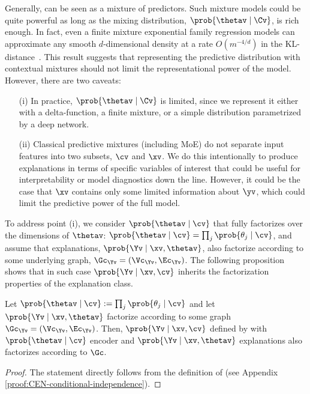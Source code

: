 \documentclass[twoside,11pt]{article}
\begin{document}
\noindent
Generally, {\CEN} can be seen as a mixture of predictors.
Such mixture models could be quite powerful as long as the mixing distribution, $\prob{\thetav \mid \Cv}$, is rich enough.
In fact, even a finite mixture exponential family regression models can approximate any smooth $d$-dimensional density at a rate $O(m^{-4/d})$ in the KL-distance~\citep{jiang1999hierarchical}.
This result suggests that representing the predictive distribution with contextual mixtures should not limit the representational power of the model.
However, there are two caveats:
\begin{itemize}[itemsep=0pt,parsep=1ex,topsep=1ex]
    \item[(i)] In practice, $\prob{\thetav \mid \Cv}$ is limited, since we represent it either with a delta-function, a finite mixture, or a simple distribution parametrized by a deep network.

    \item[(ii)] Classical predictive mixtures (including MoE) do not separate input features into two subsets, $\cv$ and $\xv$.
    We do this intentionally to produce explanations in terms of specific variables of interest that could be useful for interpretability or model diagnostics down the line.
    However, it could be the case that $\xv$ contains only some limited information about $\yv$, which could limit the predictive power of the full model.
\end{itemize}
To address point (i), we consider $\prob{\thetav \mid \cv}$ that fully factorizes over the dimensions of $\thetav$: $\prob{\thetav \mid \cv} = \prod_{j}\prob{\theta_j \mid \cv}$, and assume that explanations, $\prob{\Yv \mid \xv, \thetav}$, also factorize according to some underlying graph, $\Gc_{\Yv} = (\Vc_{\Yv}, \Ec_{\Yv})$.
The following proposition shows that in such case $\prob{\Yv \mid \xv, \cv}$ inherits the factorization properties of the explanation class.
\begin{proposition}
    \label{prop:CEN-conditional-independence}
    Let $\prob{\thetav \mid \cv} := \prod_{j}\prob{\theta_j \mid \cv}$ and let $\prob{\Yv \mid \xv, \thetav}$ factorize according to some graph $\Gc_{\Yv} = (\Vc_{\Yv}, \Ec_{\Yv})$.
    Then, $\prob{\Yv \mid \xv, \cv}$ defined by {\CEN} with $\prob{\thetav \mid \cv}$ encoder and $\prob{\Yv \mid \xv, \thetav}$ explanations also factorizes according to $\Gc$.
\end{proposition}
\begin{proof}
    The statement directly follows from the definition of {\CEN}
    (see Appendix \ref{proof:CEN-conditional-independence}).
\end{proof}
\end{document}
